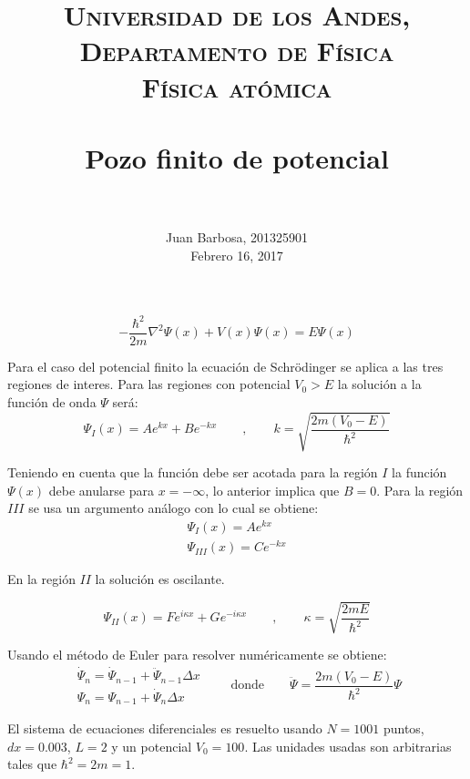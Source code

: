 \documentclass[paper=letter, fontsize=11pt]{scrartcl}
\title{
        \usefont{OT1}{bch}{b}{n}
        \normalfont \normalsize \textsc{Universidad de los Andes, Departamento de F\'isica \\
        F\'isica at\'omica} \\ [25pt]
        \horrule{0.5pt} \\[0.4cm]
        \huge Pozo finito de potencial \\
        \horrule{2pt} \\[0.5cm]
}
\author{
        \normalfont                                 \normalsize
        Juan Barbosa, 201325901\\[-3pt]      \normalsize
        Febrero 16, 2017
}
\date{}
\begin{document}
\maketitle

\[
\boxed{-\dfrac{\hbar^2}{2m}\nabla^2\Psi(x) + V(x)\Psi(x) = E\Psi(x)}
\]

Para el caso del potencial finito la ecuaci\'on de Schr\"odinger se aplica a las tres regiones de interes. Para las regiones con potencial $V_0 > E$ la soluci\'on a la funci\'on de onda $\Psi$ ser\'a:
\begin{equation}
	\Psi_{I}(x) = Ae^{kx} + Be^{-kx} \qquad , \qquad k = \sqrt{\dfrac{2m(V_0-E)}{\hbar^2}}
\end{equation}

Teniendo en cuenta que la funci\'on debe ser acotada para la regi\'on $I$ la funci\'on $\Psi(x)$ debe anularse para $x = -\infty$, lo anterior implica que $B = 0$. Para la regi\'on $III$ se usa un argumento an\'alogo con lo cual se obtiene:
\begin{equation}
	\begin{array}{c}
		\Psi_{I}(x) = Ae^{kx} \\
		\Psi_{III}(x) = Ce^{-kx}
	\end{array}
\end{equation}

En la regi\'on $II$ la soluci\'on es oscilante.

\begin{equation}
	\Psi_{II}(x) = Fe^{i\kappa x} + Ge^{-i\kappa x} \qquad , \qquad \kappa = \sqrt{\dfrac{2mE}{\hbar^2}}
\end{equation}

Usando el m\'etodo de Euler para resolver num\'ericamente se obtiene:
\begin{equation}
	\begin{matrix}
	\dot{\Psi}_n = \dot{\Psi}_{n-1} + \ddot{\Psi}_{n-1}\Delta x \\
	\Psi_n = \Psi_{n-1} + \dot{\Psi}_n\Delta x
	\end{matrix}
	\qquad \text{donde} \qquad \ddot{\Psi} = \dfrac{2m(V_0 - E)}{\hbar^2}\Psi
\end{equation}

El sistema de ecuaciones diferenciales es resuelto usando $N = 1001$ puntos, $dx = 0.003$, $L = 2$ y un potencial $V_0 = 100$. Las unidades usadas son arbitrarias tales que $\hbar^2 =  2m =1$.
\end{document}

